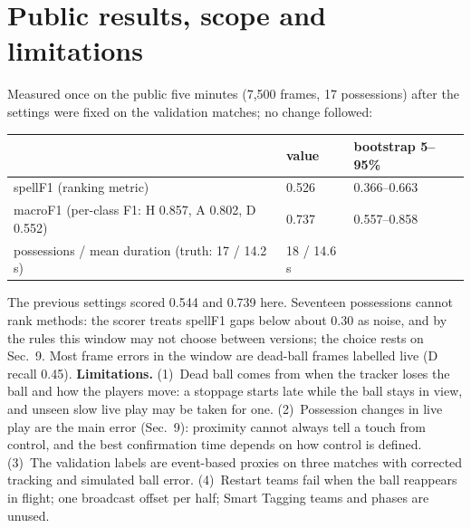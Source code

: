 \documentclass[10pt,a4paper]{article}
\begin{document}
\section{Public results, scope and limitations}
Measured once on the public five minutes (7{,}500 frames, 17 possessions) after the settings were fixed on the validation
matches; no change followed:
\begin{center}\small\vspace{-5pt}
\begin{tabular}{@{}lll@{}}
\toprule
 & value & bootstrap 5--95\% \\
\midrule
spellF1 (ranking metric) & 0.526 & 0.366--0.663 \\
macroF1 \quad(per-class F1: H 0.857, A 0.802, D 0.552) & 0.737 & 0.557--0.858 \\
possessions / mean duration \quad(truth: 17 / 14.2\,s) & 18 / 14.6\,s & \\
\bottomrule
\end{tabular}\vspace{-5pt}
\end{center}
The previous settings scored 0.544 and 0.739 here. Seventeen possessions cannot rank methods: the scorer treats spellF1 gaps below
about 0.30 as noise, and by the rules this window may not choose between versions; the choice rests on Sec.~9.
Most frame errors in the window are dead-ball frames labelled live (D recall 0.45).
\textbf{Limitations.} (1)~Dead ball comes from when the tracker loses the ball and how the players move: a stoppage starts late
while the ball stays in view, and unseen slow live play may be taken for one. (2)~Possession changes in live play are the main
error (Sec.~9): proximity cannot always tell a touch from control, and the best confirmation time depends on how control is
defined. (3)~The validation labels are event-based proxies on three matches with corrected tracking and simulated ball error.
(4)~Restart teams fail when the ball reappears in flight; one broadcast offset per half; Smart Tagging teams and phases are unused.
\end{document}
